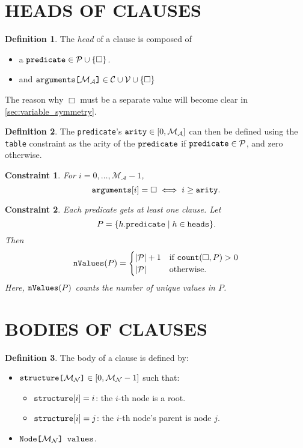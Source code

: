 \documentclass[letterpaper]{article}
\newtheorem{constraint}{Constraint}
\theoremstyle{definition}
\newtheorem{definition}{Definition}
\newcommand{\variable}[1]{\texttt{\textup{#1}}}
\newcommand{\arrayd}[3]{\variable{{#1}[}{#2}\variable{]} \in {#3}}
\newcommand{\arrayt}[3]{\variable{{#3}[}{#2}\variable{] {#1}}}
\newcommand{\predicates}{\mathcal{P}}
\newcommand{\variables}{\mathcal{V}}
\newcommand{\constants}{\mathcal{C}}
\newcommand{\maxArity}{\mathcal{M}_{\mathcal{A}}}
\newcommand{\maxNumNodes}{\mathcal{M}_{\mathcal{N}}}
\begin{document}
\section{HEADS OF CLAUSES}

\begin{definition}
  The \emph{head} of a clause is composed of
  \begin{itemize}
  \item a $\variable{predicate} \in \predicates \cup \{ \Box \}$.
  \item and $\arrayd{arguments}{\maxArity{}}{\constants{} \cup \variables{}}
    \cup \{ \Box \}$
  \end{itemize}
\end{definition}
The reason why $\Box$ must be a separate value will become clear in
\cref{sec:variable_symmetry}.

\begin{definition} \label{def:arity}
  The \variable{predicate}'s $\variable{arity} \in [0, \maxArity{}]$ can then be
  defined using the \variable{table} constraint as the arity of the
  $\variable{predicate}$ if $\variable{predicate} \in \predicates{}$, and zero
  otherwise.
\end{definition}

\begin{constraint} \label{constr:arity}
  For $i = 0, \dots, \maxArity{} - 1$,
  \[
    \variable{arguments}[i] = \Box \iff i \ge \variable{arity}.
  \]
\end{constraint}

\begin{constraint}
  Each predicate gets at least one clause. Let
  \[
    P = \{ h.\variable{predicate} \mid h \in \variable{heads} \}.
  \]
  Then
  \[
    \variable{nValues}(P) =
    \begin{cases}
      |\predicates{}| + 1 & \text{if } \variable{count}(\Box, P) > 0 \\
      |\predicates{}| & \text{otherwise.}
    \end{cases}
  \]
  Here, $\variable{nValues}(P)$ counts the number of unique values in $P$.
\end{constraint}

\section{BODIES OF CLAUSES}

\begin{definition}
  The body of a clause is defined by:
  \begin{itemize}
  \item $\arrayd{structure}{\maxNumNodes{}}{[0, \maxNumNodes{} - 1]}$ such
    that:
    \begin{itemize}
    \item $\variable{structure}[i] = i$: the $i$-th node is a root.
    \item $\variable{structure}[i] = j$: the $i$-th node's parent is node $j$.
    \end{itemize}
  \item $\arrayt{values}{\maxNumNodes{}}{Node}$.
  \end{itemize}
\end{definition}
\end{document}
